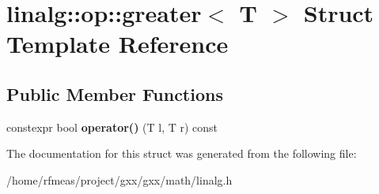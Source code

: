 \hypertarget{structlinalg_1_1op_1_1greater}{}\section{linalg\+:\+:op\+:\+:greater$<$ T $>$ Struct Template Reference}
\label{structlinalg_1_1op_1_1greater}
\subsection*{Public Member Functions}
\begin{DoxyCompactItemize}
\item 
constexpr bool {\bfseries operator()} (T l, T r) const \hypertarget{structlinalg_1_1op_1_1greater_a3bccea08e8de1169df069b59a9e7e510}{}\label{structlinalg_1_1op_1_1greater_a3bccea08e8de1169df069b59a9e7e510}

\end{DoxyCompactItemize}


The documentation for this struct was generated from the following file\+:\begin{DoxyCompactItemize}
\item 
/home/rfmeas/project/gxx/gxx/math/linalg.\+h\end{DoxyCompactItemize}
